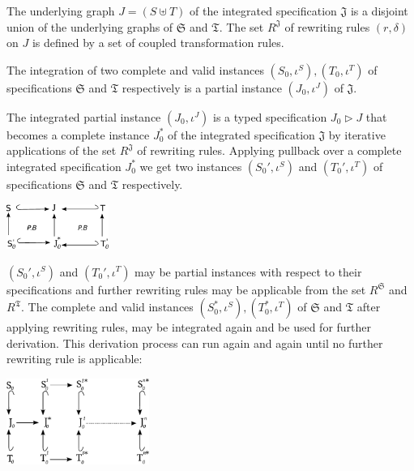 \documentclass{eceasst}
\begin{document}
\begin{remark}
 The underlying graph $J = (S \uplus T)$ of the integrated specification $\mathfrak{J}$ is a disjoint union of the underlying graphs of $\mathfrak{S}$ and $\mathfrak{T}$. 
 The set $R^{\mathfrak{J}}$ of rewriting rules $(r,\delta)$ on $J$ is defined by a set of coupled transformation rules. 
\end{remark}

\begin{proposition}
 The integration of two complete and valid instances $(S_0, \iota^S), (T_0, \iota^T)$ of specifications $\mathfrak{S}$ and $\mathfrak{T}$ respectively is a partial instance 
 $(J_0, \iota^J)$ of $\mathfrak{J}$.  
\end{proposition}

The integrated partial instance $(J_0, \iota^J)$ is a typed specification $J_0 \rhd J$ that becomes a complete instance $J_0^*$ of the integrated specification 
$\mathfrak{J}$ by iterative applications of the set $R^{\mathfrak{J}}$ of rewriting rules. 
Applying pullback over a complete integrated specification $J_0^*$ we get two instances $(S_0', \iota^S)$ and $(T_0', \iota^T)$ of 
specifications $\mathfrak{S}$ and $\mathfrak{T}$ respectively.

\begin{center}
\includegraphics[width=0.25\textwidth]{intr-pb.pdf}
\end{center}

\noindent
$(S_0', \iota^S)$ and $(T_0', \iota^T)$ may be partial instances with respect to their specifications and further rewriting rules may be applicable 
from the set $R^{\mathfrak{S}}$ and $R^{\mathfrak{T}}$. The complete and valid instances $(S_0^*, \iota^S), (T_0^*, \iota^T)$ of $\mathfrak{S}$ and $\mathfrak{T}$ after applying rewriting rules, 
may be integrated again and be used for further derivation. This derivation process can run again and again until no further rewriting rule is applicable: 

\begin{center}
\includegraphics[width=0.35\textwidth]{fixpoint.pdf}
\end{center}
\end{document}
